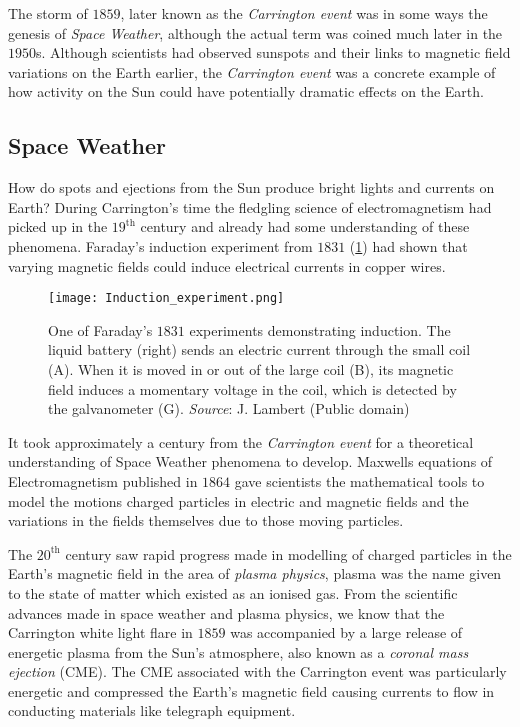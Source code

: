 The storm of $1859$, later known as the \emph{Carrington event} was in some ways the genesis of 
\emph{Space Weather}, although the actual term was coined much later in the $1950$s. Although 
scientists had observed sunspots and their links to magnetic field variations on the Earth earlier, 
the \emph{Carrington event} was a concrete example of how activity on the Sun could have 
potentially dramatic effects on the Earth.

\subsection*{Space Weather}

How do spots and ejections from the Sun produce bright lights and currents on Earth? During 
Carrington's time the fledgling science of electromagnetism had picked up in the $19^{\text{th}}$ 
century and already had some understanding of these phenomena. Faraday's induction experiment from 
$1831$ (\cref{fig:induction}) had shown that varying magnetic fields could induce electrical 
currents in copper wires.

\begin{figure}
    \noindent\centering\texttt{[image: Induction\_experiment.png]}
    \caption{
        {\small
            One of Faraday's $1831$ experiments demonstrating induction. 
            The liquid battery (right) sends an electric current through the small coil (A). 
            When it is moved in or out of the large coil (B), its magnetic field induces a 
            momentary voltage in the coil, which is detected by the galvanometer (G). 
            \textit{Source}: J. Lambert (Public domain)
        }
    }
    \label{fig:induction}
\end{figure}

It took approximately a century from the \emph{Carrington event} for a theoretical understanding of 
Space Weather phenomena to develop. Maxwells equations of Electromagnetism \citep{maxwell1865viii} 
published in $1864$ gave scientists the mathematical tools to model the motions charged particles 
in electric and magnetic fields and the variations in the fields themselves due to those moving 
particles.

The $20^{\text{th}}$ century saw rapid progress made in modelling of charged particles in the 
Earth's magnetic field in the area of \emph{plasma physics}, plasma was the name given to the state 
of matter which existed as an ionised gas. From the scientific advances made in space weather and 
plasma physics, we know that the Carrington white light flare in $1859$ was accompanied by a large 
release of energetic plasma from the Sun's atmosphere, also known as a \emph{coronal mass ejection} 
(CME). The CME associated with the Carrington event was particularly energetic and compressed the 
Earth's magnetic field causing currents to flow in conducting materials like telegraph equipment. 

